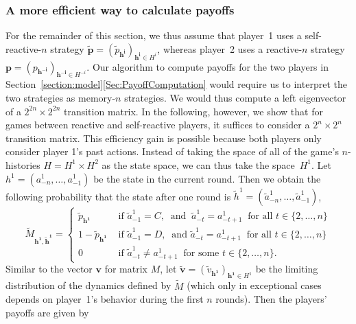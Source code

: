 \documentclass[9pt,twoside,lineno]{pnas-new}
\theoremstyle{plainCl1}
\theoremstyle{plainCl2}
\begin{document}
\subsubsection*{A more efficient way to calculate payoffs}
For the remainder of this section, we thus assume that player~1 uses a self-reactive-$n$ strategy $\mathbf{\tilde p}\!=\!(\tilde p_\mathbf{h^i})_{\mathbf{h^i}\in H^i}$, whereas player~2 uses a reactive-$n$ strategy $\mathbf{p}\!=\!(p_\mathbf{h^{-i}})_{\mathbf{h^{-i}}\in H^{-i}}$. 
Our algorithm to compute payoffs for the two players in Section~\ref{section:model}\ref{Sec:PayoffComputation} would require us to interpret the two strategies as memory-$n$ strategies. 
We would thus compute a left eigenvector of a $2^{2n}\!\times\!2^{2n}$ transition matrix. 
In the following, however, we show that for games between reactive and self-reactive players, it suffices to consider a $2^n\!\times\!2^n$ transition matrix.
This efficiency gain is possible because both players only consider player 1's past actions.  
Instead of taking the space of all of the game's $n$-histories $H\!=\!H^1\!\times\! H^2$  as the state space, we can thus take the space~$H^1$. 
Let \(h^1=(a^1_{-n},\ldots,a^1_{-1})\) be the state in the current round. 
Then we obtain the following probability that the state after one round is  \(\tilde{h}^1=(\tilde{a}^1_{-n},\ldots,\tilde{a}^1_{-1})\),\begin{equation}\label{Eq:TransitionMatrixSelfReactive}
\tilde{M}_{\mathbf{h^1},\mathbf{ \tilde{h}^1}} = 
\begin{cases}
  \tilde{p}_\mathbf{h^1} & \text{ if } \tilde{a}^1_{-1}\! =\! C,~\text{ and }~\tilde{a}^1_{-t} \!=\! a^1_{-t + 1}~\text{ for all } t\!\in\!\{2,\ldots,n\}\\
  1 - \tilde{p}_\mathbf{h^1} & \text{ if } \tilde{a}^1_{-1}\!=\! D,~\text{ and } \tilde{a}^1_{-t} \!=\! a^1_{-t + 1}~\text{ for all } t\!\in\!\{2,\ldots,n\}\\
  0 & \text{ if } \tilde{a}^1_{-t} \!\neq\!  a^1_{-t + 1}~ \text{ for some } t\!\in\!\{2,\ldots,n\}.
\end{cases}
\end{equation}
Similar to the vector $\mathbf{v}$ for matrix $M$, let $\mathbf{\tilde{v}}\!=\!(\tilde{v}_\mathbf{h^1})_{\mathbf{h^1}\in H^1}$ be the limiting distribution of the dynamics defined by $\tilde M$ (which only in exceptional cases depends on player~1's behavior during the first $n$ rounds). Then the players' payoffs are given by
\end{document}
